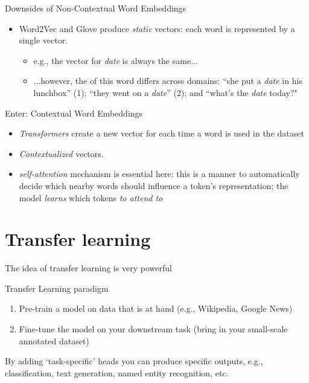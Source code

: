 \documentclass[compress]{beamer}
\begin{document}
\begin{frame}
\begin{alertblock}{Downsides of Non-Contextual Word Embeddings}
	\begin{itemize}
		\item Word2Vec and Glove produce \emph{static} vectors: each word is represented by a single vector.
		\begin{itemize}	
\item e.g., the vector for \emph{date} is always the same...
\item ...however, the  of this word differs across domains: ``she put a \emph{date} in his lunchbox'' (1); ``they went on a \emph{date}'' (2); and ``what's the \emph{date} today?"
		\end{itemize}
	\end{itemize}
\end{alertblock}
\begin{exampleblock}{Enter: Contextual Word Embeddings}
	\begin{itemize}
		\item \emph{Transformers} create a new vector for each time a word is used in the dataset
		\item \emph{Contextualized} vectors.
		\item \textit{self-attention} mechanism is essential here: this is a manner to automatically decide which nearby words should influence a token's representation; the model  \textit{learns} which tokens \emph{to attend to} 
	\end{itemize}
\end{exampleblock}
\end{frame}

\section{Transfer learning}

\begin{frame}{The idea of transfer learning is very powerful}
	\begin{block}{Transfer Learning paradigm}
		\begin{enumerate}
			\item \alert{Pre-train} a model on data that is at hand (e.g., Wikipedia, Google News)
			\item \alert{Fine-tune} the model on your downstream task (bring in your small-scale annotated dataset)
		\end{enumerate}
	By adding `task-specific' heads you can produce specific outputs, e.g., classification, text generation, named entity recognition, etc. 
	\end{block}
\end{frame}
	
\end{document}
